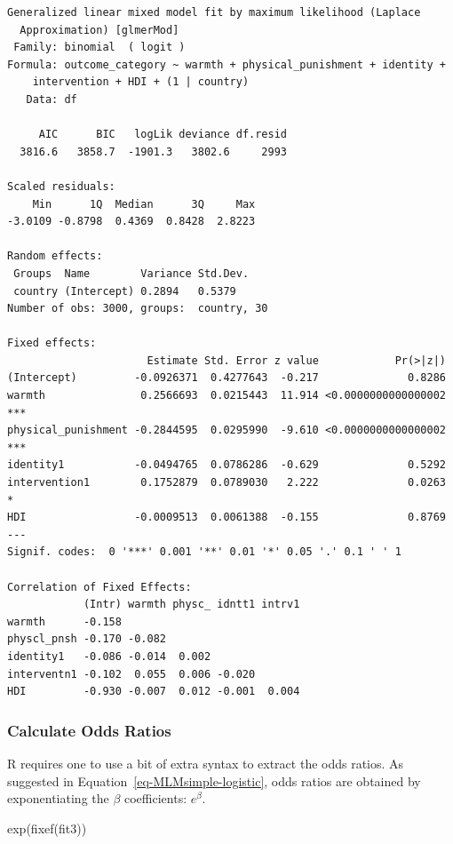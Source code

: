 \documentclass[
  letterpaper,
  DIV=11,
  numbers=noendperiod]{scrreprt}
\newenvironment{Shaded}{\begin{snugshade}}{\end{snugshade}}
\newcommand{\FunctionTok}[1]{\textcolor[rgb]{0.28,0.35,0.67}{#1}}
\newcommand{\NormalTok}[1]{\textcolor[rgb]{0.00,0.23,0.31}{#1}}
\begin{document}
\begin{verbatim}
Generalized linear mixed model fit by maximum likelihood (Laplace
  Approximation) [glmerMod]
 Family: binomial  ( logit )
Formula: outcome_category ~ warmth + physical_punishment + identity +  
    intervention + HDI + (1 | country)
   Data: df

     AIC      BIC   logLik deviance df.resid 
  3816.6   3858.7  -1901.3   3802.6     2993 

Scaled residuals: 
    Min      1Q  Median      3Q     Max 
-3.0109 -0.8798  0.4369  0.8428  2.8223 

Random effects:
 Groups  Name        Variance Std.Dev.
 country (Intercept) 0.2894   0.5379  
Number of obs: 3000, groups:  country, 30

Fixed effects:
                      Estimate Std. Error z value            Pr(>|z|)    
(Intercept)         -0.0926371  0.4277643  -0.217              0.8286    
warmth               0.2566693  0.0215443  11.914 <0.0000000000000002 ***
physical_punishment -0.2844595  0.0295990  -9.610 <0.0000000000000002 ***
identity1           -0.0494765  0.0786286  -0.629              0.5292    
intervention1        0.1752879  0.0789030   2.222              0.0263 *  
HDI                 -0.0009513  0.0061388  -0.155              0.8769    
---
Signif. codes:  0 '***' 0.001 '**' 0.01 '*' 0.05 '.' 0.1 ' ' 1

Correlation of Fixed Effects:
            (Intr) warmth physc_ idntt1 intrv1
warmth      -0.158                            
physcl_pnsh -0.170 -0.082                     
identity1   -0.086 -0.014  0.002              
interventn1 -0.102  0.055  0.006 -0.020       
HDI         -0.930 -0.007  0.012 -0.001  0.004
\end{verbatim}

\subsubsection{Calculate Odds Ratios}\label{calculate-odds-ratios}

R requires one to use a bit of extra syntax to extract the odds ratios.
As suggested in Equation~\ref{eq-MLMsimple-logistic}, odds ratios are
obtained by exponentiating the \(\beta\) coefficients: \(e^{\beta}\).

\begin{Shaded}
\begin{Highlighting}[]
\FunctionTok{exp}\NormalTok{(}\FunctionTok{fixef}\NormalTok{(fit3))}
\end{Highlighting}
\end{Shaded}
\end{document}
